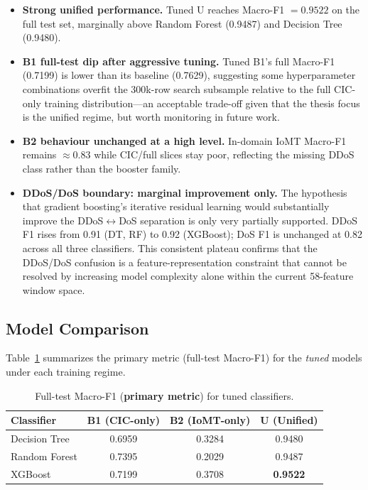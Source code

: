 \begin{itemize}[nosep]
  \item \textbf{Strong unified performance.} Tuned U reaches Macro-F1 $=0.9522$ on the full test set, marginally above Random Forest (0.9487) and Decision Tree (0.9480).
  \item \textbf{B1 full-test dip after aggressive tuning.} Tuned B1's full Macro-F1 (0.7199) is lower than its baseline (0.7629), suggesting some hyperparameter combinations overfit the 300k-row search subsample relative to the full CIC-only training distribution---an acceptable trade-off given that the thesis focus is the unified regime, but worth monitoring in future work.
  \item \textbf{B2 behaviour unchanged at a high level.} In-domain IoMT Macro-F1 remains $\approx0.83$ while CIC/full slices stay poor, reflecting the missing DDoS class rather than the booster family.
  \item \textbf{DDoS/DoS boundary: marginal improvement only.} The hypothesis that gradient boosting's iterative residual learning would substantially improve the DDoS$\leftrightarrow$DoS separation is only very partially supported. DDoS F1 rises from 0.91 (DT, RF) to 0.92 (XGBoost); DoS F1 is unchanged at 0.82 across all three classifiers. This consistent plateau confirms that the DDoS/DoS confusion is a feature-representation constraint that cannot be resolved by increasing model complexity alone within the current 58-feature window space.
\end{itemize}

\subsection{Model Comparison}
\label{subsec:model-comparison}

Table~\ref{tab:model-compare-f1m} summarizes the primary metric (full-test Macro-F1) for the \emph{tuned} models under each training regime.

\begin{table}[H]
\centering
\caption{Full-test Macro-F1 (\textbf{primary metric}) for tuned classifiers.}
\label{tab:model-compare-f1m}
\small
\begin{tabular}{@{}l c c c@{}}
\toprule
\textbf{Classifier} & \textbf{B1 (CIC-only)} & \textbf{B2 (IoMT-only)} & \textbf{U (Unified)} \\
\midrule
Decision Tree  & 0.6959 & 0.3284 & 0.9480 \\
Random Forest  & 0.7395 & 0.2029 & 0.9487 \\
XGBoost        & 0.7199 & 0.3708 & \textbf{0.9522} \\
\bottomrule
\end{tabular}
\end{table}

